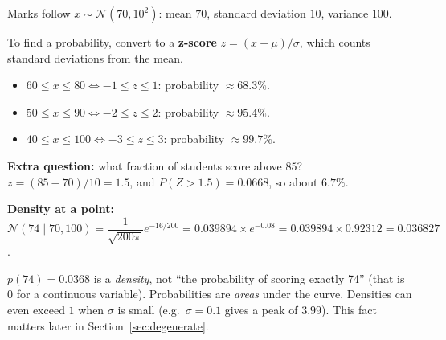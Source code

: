 \documentclass[11pt,a4paper]{article}
\newcommand{\N}{\mathcal{N}}
\begin{document}
\begin{example}
Marks follow $x\sim\N(70,10^2)$: mean $70$, standard deviation $10$, variance $100$.

\begin{center}
\end{center}

To find a probability, convert to a \textbf{z-score} $z=(x-\mu)/\sigma$, which counts standard deviations from the mean.
\begin{itemize}[nosep]
\item $60\le x\le80 \iff -1\le z\le1$: probability $\approx68.3\%$.
\item $50\le x\le90 \iff -2\le z\le2$: probability $\approx95.4\%$.
\item $40\le x\le100\iff -3\le z\le3$: probability $\approx99.7\%$.
\end{itemize}
\textbf{Extra question:} what fraction of students score above $85$? $z=(85-70)/10=1.5$, and $P(Z>1.5)=0.0668$, so about $6.7\%$.

\textbf{Density at a point:} $\N(74\mid70,100)=\dfrac{1}{\sqrt{200\pi}}e^{-16/200}=0.039894\times e^{-0.08}=0.039894\times0.92312=0.036827$.
\end{example}

\begin{caution}
$p(74)=0.0368$ is a \emph{density}, not ``the probability of scoring exactly 74'' (that is $0$ for a continuous variable). Probabilities are \emph{areas} under the curve. Densities can even exceed $1$ when $\sigma$ is small (e.g.\ $\sigma=0.1$ gives a peak of $3.99$). This fact matters later in Section~\ref{sec:degenerate}.
\end{caution}
\end{document}
